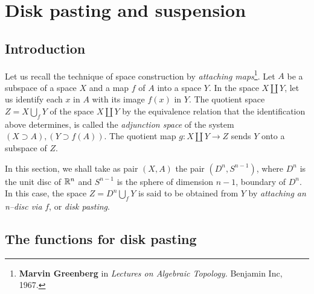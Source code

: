 \chapter {Disk pasting and suspension}

\section{Introduction}

Let us recall the technique of space construction by 
{\em attaching maps}\footnote {{\bf Marvin Greenberg} in
{\em Lectures on Algebraic Topology.} Benjamin Inc, 1967.}. Let $A$ be a subspace of a space $X$ and a map
$f$ of $A$ into a space $Y$. In the space $X \coprod Y$, let us identify each $x$ in $A$ with its image
$f(x)$ in $Y$. The quotient space $Z=X\bigcup_f Y$ of the space $X\coprod Y$ by the equivalence
relation that the identification above determines, is called the {\em adjunction space} of the system
$(X \supset A), (Y\supset f(A))$. The quotient map $g: X\coprod Y \rightarrow Z$ sends $Y$ 
onto a subspace of $Z$. 
\par
In this section, we shall take as pair $(X,A)$ the pair $(D^n, S^{n-1})$, where $D^n$ is the 
unit disc of ${{\Bbb R}}^n$ and  $S^{n-1}$ is the sphere of dimension ${n-1}$, boundary of $D^n$. In this case,
the space $Z=D^n\bigcup_f Y$ is said to be obtained from $Y$ by {\em attaching an n--disc via} $f$, or
{\em disk pasting}.

\section{The functions for  disk pasting}


